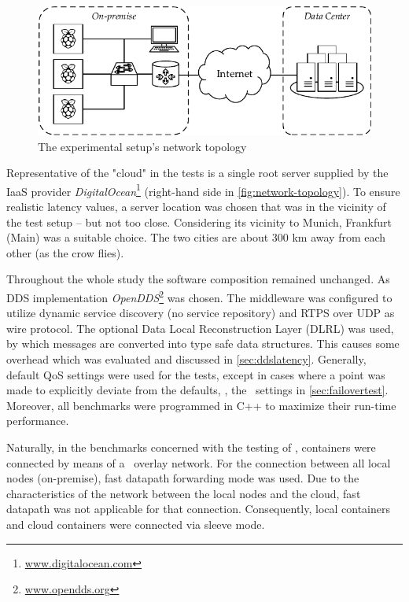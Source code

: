 \begin{figure}[htpb]
  \centering
  \includegraphics[width=\textwidth]{figures/network-setup}
  \caption[Network topology of the experimental setup]{The experimental setup's network topology}\label{fig:network-topology}
\end{figure}
%
Representative of the "cloud" in the tests is a single root server supplied by the IaaS provider \emph{DigitalOcean}\footnote{\url{www.digitalocean.com}} (right-hand side in \autoref{fig:network-topology}). To ensure realistic latency values, a server location was chosen that was in the vicinity of the test setup -- but not too close. Considering its vicinity to Munich, Frankfurt (Main) was a suitable choice. The two cities are about 300 km away from each other (as the crow flies).

Throughout the whole study the software composition remained unchanged. As DDS implementation \emph{OpenDDS}\footnote{\url{www.opendds.org}} was chosen. The middleware was configured to utilize dynamic service discovery (no service repository) and RTPS over UDP as wire protocol. The optional Data Local Reconstruction Layer (DLRL) was used, by which messages are converted into type safe data structures. This causes some overhead which was evaluated and discussed in \autoref{sec:ddslatency}. Generally, default QoS settings were used for the tests, except in cases where a point was made to explicitly deviate from the defaults, \eg , the \liveliness\ settings in \autoref{sec:failovertest}. Moreover, all benchmarks were programmed in C++ to maximize their run-time performance.

Naturally, in the benchmarks concerned with the testing of \wnet  , containers were connected by means of a \wnet\ overlay network. For the connection between all local nodes (on-premise), fast datapath forwarding mode was used. Due to the characteristics of the network between the local nodes and the cloud, fast datapath was not applicable for that connection. Consequently, local containers and cloud containers were connected via sleeve mode.

